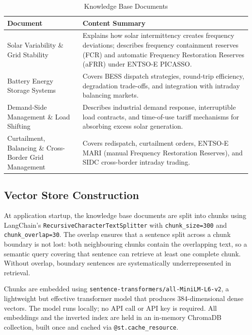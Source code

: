 \documentclass[12pt, a4paper]{article}
\begin{document}
\begin{table}[H]
    \centering
    \caption{Knowledge Base Documents}
    \begin{tabularx}{\textwidth}{lX}
        \toprule
        \textbf{Document} & \textbf{Content Summary} \\
        \midrule
        Solar Variability \& Grid Stability & Explains how solar intermittency creates frequency deviations; describes frequency containment reserves (FCR) and automatic Frequency Restoration Reserves (aFRR) under ENTSO-E PICASSO. \\
        Battery Energy Storage Systems & Covers BESS dispatch strategies, round-trip efficiency, degradation trade-offs, and integration with intraday balancing markets. \\
        Demand-Side Management \& Load Shifting & Describes industrial demand response, interruptible load contracts, and time-of-use tariff mechanisms for absorbing excess solar generation. \\
        Curtailment, Balancing \& Cross-Border Grid Management & Covers redispatch, curtailment orders, ENTSO-E MARI (manual Frequency Restoration Reserves), and SIDC cross-border intraday trading. \\
        \bottomrule
    \end{tabularx}
\end{table}

\subsection{Vector Store Construction}

At application startup, the knowledge base documents are split into chunks using LangChain's \texttt{RecursiveCharacterTextSplitter} with \texttt{chunk\_size=300} and \texttt{chunk\_overlap=30}. The overlap ensures that a sentence split across a chunk boundary is not lost: both neighbouring chunks contain the overlapping text, so a semantic query covering that sentence can retrieve at least one complete chunk. Without overlap, boundary sentences are systematically underrepresented in retrieval.

Chunks are embedded using \texttt{sentence-transformers/all-MiniLM-L6-v2}, a lightweight but effective transformer model that produces 384-dimensional dense vectors. The model runs locally; no API call or API key is required. All embeddings and the inverted index are held in an in-memory ChromaDB collection, built once and cached via \texttt{@st.cache\_resource}.
\end{document}
